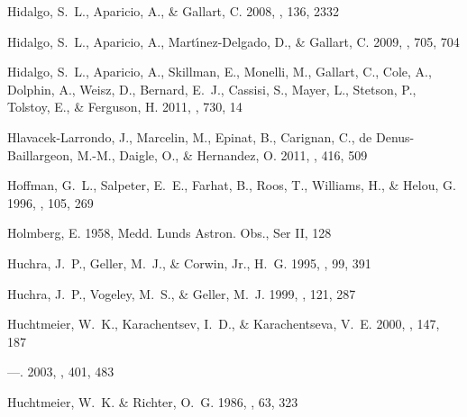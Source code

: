 \documentclass[manuscript]{aastex}
\begin{document}
\begin{thebibliography}{381}
{Hidalgo}, S.~L., {Aparicio}, A., \& {Gallart}, C. 2008, \aj, 136, 2332

{Hidalgo}, S.~L., {Aparicio}, A., {Mart{\'{\i}}nez-Delgado}, D., \& {Gallart},
  C. 2009, \apj, 705, 704

{Hidalgo}, S.~L., {Aparicio}, A., {Skillman}, E., {Monelli}, M., {Gallart}, C.,
  {Cole}, A., {Dolphin}, A., {Weisz}, D., {Bernard}, E.~J., {Cassisi}, S.,
  {Mayer}, L., {Stetson}, P., {Tolstoy}, E., \& {Ferguson}, H. 2011, \apj, 730,
  14

{Hlavacek-Larrondo}, J., {Marcelin}, M., {Epinat}, B., {Carignan}, C., {de
  Denus-Baillargeon}, M.-M., {Daigle}, O., \& {Hernandez}, O. 2011, \mnras,
  416, 509

{Hoffman}, G.~L., {Salpeter}, E.~E., {Farhat}, B., {Roos}, T., {Williams}, H.,
  \& {Helou}, G. 1996, \apjs, 105, 269

{Holmberg}, E. 1958, Medd. Lunds Astron. Obs., Ser II, 128

{Huchra}, J.~P., {Geller}, M.~J., \& {Corwin}, Jr., H.~G. 1995, \apjs, 99, 391

{Huchra}, J.~P., {Vogeley}, M.~S., \& {Geller}, M.~J. 1999, \apjs, 121, 287

{Huchtmeier}, W.~K., {Karachentsev}, I.~D., \& {Karachentseva}, V.~E. 2000,
  \aaps, 147, 187

---. 2003, \aap, 401, 483

{Huchtmeier}, W.~K. \& {Richter}, O.~G. 1986, \aaps, 63, 323


\end{thebibliography}
\end{document}
